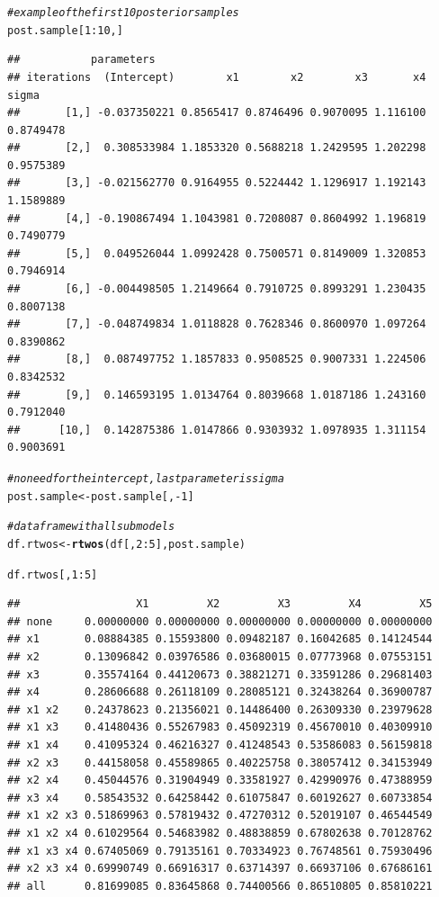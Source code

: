 \documentclass[11pt,a4paper,twoside]{book}\usepackage[]{graphicx}\usepackage[]{color}
\makeatletter
\newcommand{\hlnum}[1]{\textcolor[rgb]{0.686,0.059,0.569}{#1}}%
\newcommand{\hlcom}[1]{\textcolor[rgb]{0.678,0.584,0.686}{\textit{#1}}}%
\newcommand{\hlopt}[1]{\textcolor[rgb]{0,0,0}{#1}}%
\newcommand{\hlstd}[1]{\textcolor[rgb]{0.345,0.345,0.345}{#1}}%
\newcommand{\hlkwb}[1]{\textcolor[rgb]{0.69,0.353,0.396}{#1}}%
\newcommand{\hlkwd}[1]{\textcolor[rgb]{0.737,0.353,0.396}{\textbf{#1}}}%
\newenvironment{kframe}{%
 \def\at@end@of@kframe{}%
 \ifinner\ifhmode%
  \def\at@end@of@kframe{\end{minipage}}%
  \begin{minipage}{\columnwidth}%
 \fi\fi%
 \def\FrameCommand##1{\hskip\@totalleftmargin \hskip-\fboxsep
 \colorbox{shadecolor}{##1}\hskip-\fboxsep
     \hskip-\linewidth \hskip-\@totalleftmargin \hskip\columnwidth}%
 \MakeFramed {\advance\hsize-\width
   \@totalleftmargin\z@ \linewidth\hsize
   \@setminipage}}%
 {\par\unskip\endMakeFramed%
 \at@end@of@kframe}
\newenvironment{knitrout}{}{} %
\makeatother
\begin{document}
\begin{knitrout}
\begin{kframe}
\begin{alltt}
\hlcom{#example of the first 10 posterior samples}
\hlstd{post.sample[}\hlnum{1}\hlopt{:}\hlnum{10}\hlstd{,]}
\end{alltt}
\begin{verbatim}
##           parameters
## iterations  (Intercept)        x1        x2        x3       x4     sigma
##       [1,] -0.037350221 0.8565417 0.8746496 0.9070095 1.116100 0.8749478
##       [2,]  0.308533984 1.1853320 0.5688218 1.2429595 1.202298 0.9575389
##       [3,] -0.021562770 0.9164955 0.5224442 1.1296917 1.192143 1.1589889
##       [4,] -0.190867494 1.1043981 0.7208087 0.8604992 1.196819 0.7490779
##       [5,]  0.049526044 1.0992428 0.7500571 0.8149009 1.320853 0.7946914
##       [6,] -0.004498505 1.2149664 0.7910725 0.8993291 1.230435 0.8007138
##       [7,] -0.048749834 1.0118828 0.7628346 0.8600970 1.097264 0.8390862
##       [8,]  0.087497752 1.1857833 0.9508525 0.9007331 1.224506 0.8342532
##       [9,]  0.146593195 1.0134764 0.8039668 1.0187186 1.243160 0.7912040
##      [10,]  0.142875386 1.0147866 0.9303932 1.0978935 1.311154 0.9003691
\end{verbatim}
\begin{alltt}
\hlcom{#no need for the intercept, last parameter is sigma}
\hlstd{post.sample} \hlkwb{<-} \hlstd{post.sample[,}\hlopt{-}\hlnum{1}\hlstd{]}


\hlcom{#data frame with all submodels}
\hlstd{df.rtwos} \hlkwb{<-}\hlkwd{rtwos}\hlstd{(df[,}\hlnum{2}\hlopt{:}\hlnum{5}\hlstd{], post.sample)}

\hlstd{df.rtwos[,}\hlnum{1}\hlopt{:}\hlnum{5}\hlstd{]}
\end{alltt}
\begin{verbatim}
##                  X1         X2         X3         X4         X5
## none     0.00000000 0.00000000 0.00000000 0.00000000 0.00000000
## x1       0.08884385 0.15593800 0.09482187 0.16042685 0.14124544
## x2       0.13096842 0.03976586 0.03680015 0.07773968 0.07553151
## x3       0.35574164 0.44120673 0.38821271 0.33591286 0.29681403
## x4       0.28606688 0.26118109 0.28085121 0.32438264 0.36900787
## x1 x2    0.24378623 0.21356021 0.14486400 0.26309330 0.23979628
## x1 x3    0.41480436 0.55267983 0.45092319 0.45670010 0.40309910
## x1 x4    0.41095324 0.46216327 0.41248543 0.53586083 0.56159818
## x2 x3    0.44158058 0.45589865 0.40225758 0.38057412 0.34153949
## x2 x4    0.45044576 0.31904949 0.33581927 0.42990976 0.47388959
## x3 x4    0.58543532 0.64258442 0.61075847 0.60192627 0.60733854
## x1 x2 x3 0.51869963 0.57819432 0.47270312 0.52019107 0.46544549
## x1 x2 x4 0.61029564 0.54683982 0.48838859 0.67802638 0.70128762
## x1 x3 x4 0.67405069 0.79135161 0.70334923 0.76748561 0.75930496
## x2 x3 x4 0.69990749 0.66916317 0.63714397 0.66937106 0.67686161
## all      0.81699085 0.83645868 0.74400566 0.86510805 0.85810221
\end{verbatim}
\end{kframe}
\end{knitrout}
\end{document}
